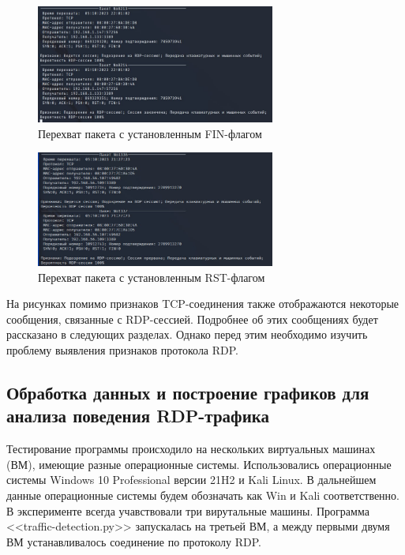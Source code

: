 \documentclass[bachelor, och, coursework]{SCWorks}
\begin{document}
\begin{figure}[H]
  \centering
  \includegraphics[width=0.7\textwidth]{photo/ses-fin.jpg}
  \caption{Перехват пакета с установленным FIN-флагом}
  \label{ses-fin}
\end{figure}


\begin{figure}[H]
  \centering
  \includegraphics[width=0.7\textwidth]{photo/ses-rst.jpg}
  \caption{Перехват пакета с установленным RST-флагом}
  \label{ses-rst}
\end{figure}

На рисунках помимо признаков TCP-соединения также отображаются некоторые сообщения, связанные с RDP-сессией. 
Подробнее об этих сообщениях будет рассказано в следующих разделах. Однако перед этим необходимо изучить 
проблему выявления признаков протокола RDP.

\subsection{Обработка данных и построение графиков для анализа поведения RDP-трафика}

Тестирование программы происходило на нескольких виртуальных машинах (ВМ), имеющие разные операционные системы.
Использовались операционные системы Windows 10 Professional версии 21H2 и Kali Linux. В дальнейшем данные 
операционные системы будем обозначать как Win и Kali соответственно. В эксперименте всегда учавствовали три вирутальные машины.
Программа <<traffic-detection.py>> запускалась на третьей ВМ, а между первыми двумя ВМ устанавливалось соединение по протоколу RDP.
\end{document}
